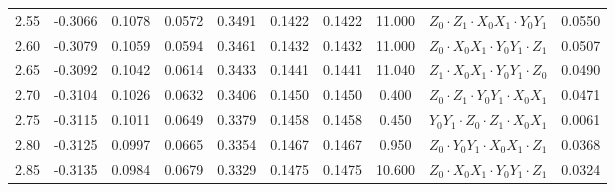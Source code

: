 \begin{tabular}{c|c|c|c|c|c|c|c|c|c}
2.55 & -0.3066 & 0.1078 & 0.0572 & 0.3491 & 0.1422 & 0.1422 & 11.000 & $Z_0 \cdot Z_1 \cdot X_0 X_1 \cdot Y_0 Y_1$ & 0.0550 \\
2.60 & -0.3079 & 0.1059 & 0.0594 & 0.3461 & 0.1432 & 0.1432 & 11.000 & $Z_0 \cdot X_0 X_1 \cdot Y_0 Y_1 \cdot Z_1$ & 0.0507 \\
2.65 & -0.3092 & 0.1042 & 0.0614 & 0.3433 & 0.1441 & 0.1441 & 11.040 & $Z_1 \cdot X_0 X_1 \cdot Y_0 Y_1 \cdot Z_0$ & 0.0490 \\
2.70 & -0.3104 & 0.1026 & 0.0632 & 0.3406 & 0.1450 & 0.1450 & 0.400 & $Z_0 \cdot Z_1 \cdot Y_0 Y_1 \cdot X_0 X_1$ & 0.0471 \\
2.75 & -0.3115 & 0.1011 & 0.0649 & 0.3379 & 0.1458 & 0.1458 & 0.450 & $Y_0 Y_1 \cdot Z_0 \cdot Z_1 \cdot X_0 X_1$ & 0.0061 \\
2.80 & -0.3125 & 0.0997 & 0.0665 & 0.3354 & 0.1467 & 0.1467 & 0.950 & $Z_0 \cdot Y_0 Y_1 \cdot X_0 X_1 \cdot Z_1$ & 0.0368 \\
2.85 & -0.3135 & 0.0984 & 0.0679 & 0.3329 & 0.1475 & 0.1475 & 10.600 & $Z_0 \cdot X_0 X_1 \cdot Y_0 Y_1 \cdot Z_1$ & 0.0324 \\
\end{tabular}
